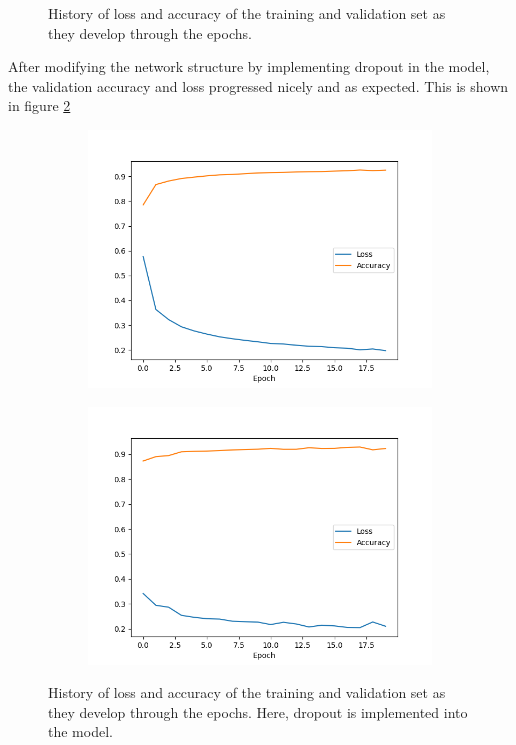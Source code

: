 \documentclass[../main.tex]{subfiles}
\begin{document}
\begin{figure}[H]
\begin{subfigure}{.5\textwidth}
    \end{subfigure}
    \caption{History of loss and accuracy of the training and validation set as they develop through the epochs.}
    \label{fig:fashion_mnist_cnn_history}
\end{figure}

After modifying the network structure by implementing dropout in the model, the validation accuracy and loss progressed nicely and as expected. This is shown in figure \ref{fig:fashion_mnist_cnn_dropout_history}

\begin{figure}[H]
    \begin{subfigure}{.5\textwidth}
        \centering
        \includegraphics[width=1.1\linewidth]{assets/fashion_mnist_train_history_dropout.png}
    \end{subfigure}
    \begin{subfigure}{.5\textwidth}
        \centering
        \includegraphics[width=1.1\linewidth]{assets/fashion_mnist_val_history_dropout.png}
    \end{subfigure}
    \caption{History of loss and accuracy of the training and validation set as they develop through the epochs. Here, dropout is implemented into the model.}
    \label{fig:fashion_mnist_cnn_dropout_history}
\end{figure}
\end{document}

